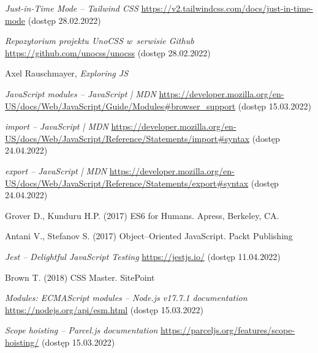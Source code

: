 \documentclass{SGGW-thesis}
\begin{document}
\begin{thebibliography}{9}
\textit{Just-in-Time Mode -- Tailwind CSS}
\url{https://v2.tailwindcss.com/docs/just-in-time-mode} (dostęp 28.02.2022)

\textit{Repozytorium projektu UnoCSS w~serwisie Github}
\url{https://github.com/unocss/unocss} (dostęp 28.02.2022)

Axel Rauschmayer, \textit{Exploring JS}

\textit{JavaScript modules -- JavaScript | MDN}
\url{https://developer.mozilla.org/en-US/docs/Web/JavaScript/Guide/Modules#browser_support} (dostęp 15.03.2022)

\textit{import -- JavaScript | MDN}
\url{https://developer.mozilla.org/en-US/docs/Web/JavaScript/Reference/Statements/import#syntax} (dostęp 24.04.2022)

\textit{export -- JavaScript | MDN}
\url{https://developer.mozilla.org/en-US/docs/Web/JavaScript/Reference/Statements/export#syntax} (dostęp 24.04.2022)

Grover D., Kunduru H.P. (2017) ES6 for Humans. Apress, Berkeley, CA.

Antani V., Stefanov S. (2017) Object--Oriented JavaScript. Packt Publishing

\textit{Jest -- Delightful JavaScript Testing}
\url{https://jestjs.io/} (dostęp 11.04.2022)

Brown T. (2018) CSS Master. SitePoint

\textit{Modules: ECMAScript modules -- Node.js v17.7.1 documentation}
\url{https://nodejs.org/api/esm.html} (dostęp 15.03.2022)

\textit{Scope hoisting -- Parcel.js documentation}
\url{https://parceljs.org/features/scope-hoisting/} (dostęp 15.03.2022)

\end{thebibliography}

\beforelastpage
\end{document}
